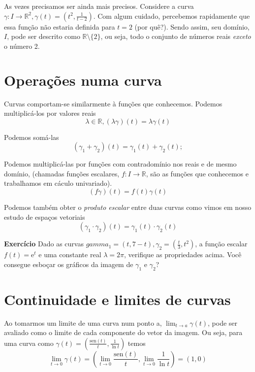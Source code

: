 \documentclass[
  letterpaper,
  DIV=11,
  numbers=noendperiod]{scrreprt}
\begin{document}
As vezes precisamos ser ainda mais precisos. Considere a curva
\(\gamma : I \rightarrow \mathbb{R}^2, \gamma(t) = \left(t^2, \frac{1}{t-2}\right)\).
Com algum cuidado, percebemos rapidamente que essa função não estaria
definida para \(t = 2\) (por quê?). Sendo assim, seu domínio, \(I\),
pode ser descrito como \(\mathbb{R} \setminus \{2\}\), ou seja, todo o
conjunto de números reais \emph{exceto} o número 2.

\section{Operações numa curva}\label{operauxe7uxf5es-numa-curva}

Curvas comportam-se similarmente à funções que conhecemos. Podemos
multiplicá-los por valores reais \[
\lambda \in \mathbb{R}, (\lambda\gamma)(t) = \lambda\gamma(t)
\]

Podemos somá-las \[
(\gamma_{1} + \gamma_{2})(t) = \gamma_{1}(t) + \gamma_{2}(t); 
\]

Podemos multiplicá-las por funções com contradomínio nos reais e de
mesmo domínio, (chamadas funções escalares,
\(f : I \rightarrow \mathbb{R}\), são as funções que conhecemos e
trabalhamos em cáculo univariado). \[
(f\gamma)(t) = f(t)\gamma(t)
\]

Podemos também obter o \emph{produto escalar} entre duas curvas como
vimos em nosso estudo de espaços vetoriais \[
(\gamma_{1} \cdot \gamma_{2})(t) = \gamma_{1}(t) \cdot \gamma_{2}(t)
\]

\textbf{Exercício} Dado as curvas
\(gamma_{1} = (t, 7 - t), \gamma_{2} = \left(\frac{t}{3}, t^2\right)\),
a função escalar \(f(t) = \mathrm{e}^t\) e uma constante real
\(\lambda = 2\pi\), verifique as propriedades acima. Você consegue
esboçar os gráficos da imagem de \(\gamma_{1}\) e \(\gamma_{2}\)?

\section{Continuidade e limites de
curvas}\label{continuidade-e-limites-de-curvas}

Ao tomarmos um limite de uma curva num ponto a,
\(\lim_{t\rightarrow a} \gamma(t)\), pode ser avaliado como o limite de
cada componente do vetor da imagem. Ou seja, para uma curva como
\(\gamma(t) = \left(\frac{\mathrm{sen}(t)}{t}, \frac{1}{\ln{t}}\right)\)
temos \[
\lim_{t\rightarrow 0}\gamma(t) = \left(\lim_{t\rightarrow 0} \frac{\mathrm{sen}(t)}{t}, 
\lim_{t\rightarrow 0} \frac{1}{\ln{t}}\right)  = (1, 0)
\]
\end{document}
